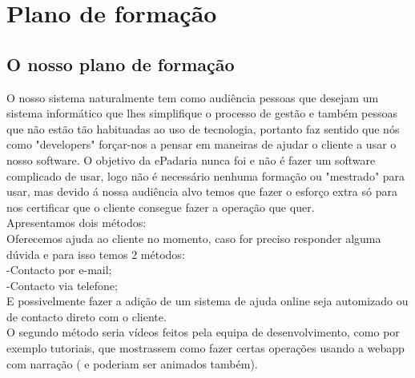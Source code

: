 \chapter{Plano de formação}
\label{plano_de_formaçao}
\section{O nosso plano de formação}
O nosso sistema naturalmente tem como audiência pessoas que desejam um sistema informático que lhes simplifique o processo de gestão e também pessoas que não estão tão habituadas ao uso de tecnologia, portanto faz sentido que nós como "developers" forçar-nos a pensar em maneiras de ajudar o cliente a usar o nosso software. O objetivo da ePadaria nunca foi e não é fazer um software complicado de usar, logo não é necessário nenhuma formação ou "mestrado" para usar, mas devido á nossa audiência alvo temos que fazer o esforço extra só para nos certificar que o cliente consegue fazer a operação que quer.\\
Apresentamos dois métodos:\\
Oferecemos ajuda ao cliente no momento, caso for preciso responder alguma dúvida e para isso temos 2 métodos:\\
 -Contacto por e-mail;\\
 -Contacto via telefone;\\
	E possivelmente fazer a adição de um sistema de ajuda online seja automizado ou de contacto direto com o cliente.\\
O segundo método seria vídeos feitos pela equipa de desenvolvimento, como por exemplo tutoriais, que mostrassem como fazer certas operações usando a webapp com narração ( e poderiam ser animados também).\\
 